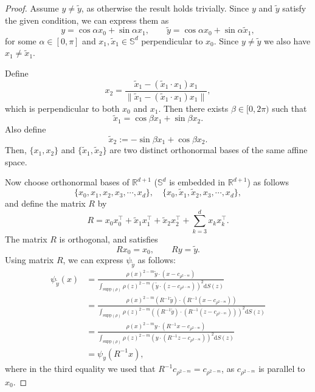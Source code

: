 \documentclass[11pt]{amsart}
\newcommand{\bbr}{\mathbb R}
\newcommand{\bbs}{\mathbb S}
\newcommand{\dz}{\mathrm{d}S (z)}
\newcommand{\supp}{\mathrm{supp}(\rho)}
\newcommand{\dm}{d} %
\begin{document}
\begin{proof}
Assume $y\neq\tilde{y}$, as otherwise the result holds trivially. Since $y$ and $\tilde{y}$ satisfy the given condition, we can express them as
\[
y=\cos\alpha x_0+\sin\alpha x_1,\qquad \tilde{y}=\cos\alpha x_0+\sin\alpha \tilde{x}_1,
\]
for some $\alpha\in[0,\pi]$ and $x_1, \tilde{x}_1\in\bbs^\dm$ perpendicular to $x_0$. Since $y\neq\tilde{y}$ we also have $x_1\neq\tilde{x}_1$. 

Define 
\[
x_2=\frac{\tilde{x}_1-(\tilde{x}_1\cdot x_1)x_1 }{\|\tilde{x}_1-(\tilde{x}_1\cdot x_1)x_1\|},
\]
which is perpendicular to both $x_0$ and $x_1$. Then there exists $\beta\in[0, 2\pi)$ such that
\[
\tilde{x}_1=\cos\beta x_1+\sin\beta x_2.
\]
Also define
\[
\tilde{x}_2:=-\sin\beta x_1+\cos\beta x_2.
\]
Then, $\{x_1,x_2\}$ and $\{\tilde{x}_1,\tilde{x}_2\}$ are two distinct orthonormal bases of the same affine space. 

Now choose orthonormal bases of $\bbr^{\dm+1}$ ($\bbs^\dm$ is embedded in $\bbr^{\dm+1}$) as follows
\[
\{x_0, x_1, x_2, x_3,\cdots, x_\dm\},\quad \{x_0, \tilde{x}_1, \tilde{x}_2, x_3, \cdots, x_\dm\},
\]
and define the matrix $R$ by
\[
R=x_0x_0^\top+\tilde{x}_1 x_1^\top+\tilde{x}_2x_2^\top+\sum_{k=3}^{\dm} x_k x_k^\top.
\]
The matrix $R$ is orthogonal, and satisfies
\[
Rx_0=x_0,\qquad Ry=\tilde{y}.
\]
Using matrix $R$, we can express $\psi_{\tilde{y}}$ as follows:
\begin{equation}
\label{eqn:phiytilde-phiy}
\begin{aligned}
\psi_{\tilde{y}}(x)&=\frac{\rho(x)^{2-m}\tilde{y}\cdot(x-c_{\rho^{2-m}})}{\int_{\supp}\rho(z)^{2-m}\left(\tilde{y}\cdot (z-c_{\rho^{2-m}})\right)^2\dz}\\[2pt]
&=\frac{\rho(x)^{2-m}(R^{-1}\tilde{y})\cdot(R^{-1}(x-c_{\rho^{2-m}}))}{\int_{\supp}\rho(z)^{2-m}\left((R^{-1}\tilde{y})\cdot (R^{-1}(z-c_{\rho^{2-m}}))\right)^2\dz}\\[2pt]
&=\frac{\rho(x)^{2-m}y\cdot(R^{-1}x-c_{\rho^{2-m}})}{\int_{\supp}\rho(z)^{2-m}\left(y\cdot (R^{-1}z-c_{\rho^{2-m}})\right)^2\dz}\\[2pt]
&=\psi_y(R^{-1}x),
\end{aligned}
\end{equation}
where in the third equality we used that $R^{-1}c_{\rho^{2-m}}=c_{\rho^{2-m}}$, as $c_{\rho^{2-m}}$ is parallel to $x_0$. 


\end{proof}
\end{document}
